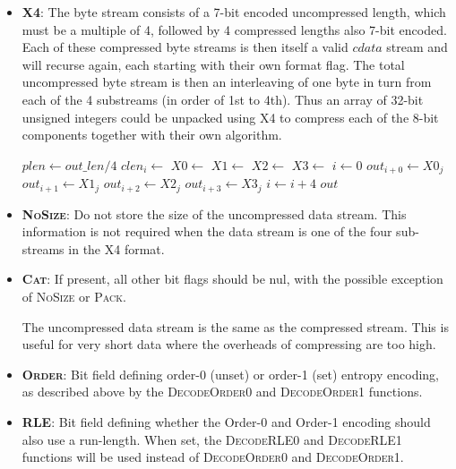 \documentclass[a4paper]{article}
\begin{document}
\begin{itemize}
\item{\textbf{\textsc{X4}}:}
The byte stream consists of a 7-bit encoded uncompressed length, which
must be a multiple of 4, followed by 4 compressed lengths also 7-bit
encoded.  Each of these compressed byte streams is then itself a valid
$cdata$ stream and will recurse again, each starting with their own
format flag.  The total uncompressed byte stream is then an
interleaving of one byte in turn from each of the 4 substreams (in
order of 1st to 4th).  Thus an array of 32-bit unsigned integers could
be unpacked using X4 to compress each of the 8-bit components together
with their own algorithm.

\begin{algorithmic}[1]
  \State $plen \gets out\_len / 4$
   
    \State $clen_i \gets $
  \EndFor
  \State $X0 \gets $ 
  \State $X1 \gets $
  \State $X2 \gets $
  \State $X3 \gets $
  \Statex
  \State $i \gets 0$
   
    \State $out_{i+0} \gets X0_j$
    \State $out_{i+1} \gets X1_j$
    \State $out_{i+2} \gets X2_j$
    \State $out_{i+3} \gets X3_j$
    \State $i \gets i+4$
  \EndFor
  \State \Return $out$
\EndFunction
\end{algorithmic}

\item{\textbf{\textsc{NoSize}}:}
Do not store the size of the uncompressed data stream.
This information is not required when the data stream is one of the four sub-streams in the X4 format.

\item{\textbf{\textsc{Cat}}:}
If present, all other bit flags should be nul, with the possible
exception of \textsc{NoSize} or \textsc{Pack}.

The uncompressed data stream is the same as the compressed stream.
This is useful for very short data where the overheads of compressing are too high.

\item{\textbf{\textsc{Order}}:}
Bit field defining order-0 (unset) or order-1 (set) entropy encoding, as described above by the \textsc{DecodeOrder0} and \textsc{DecodeOrder1} functions.

\item{\textbf{\textsc{RLE}}:}
Bit field defining whether the Order-0 and Order-1 encoding should also use a run-length.
When set, the \textsc{DecodeRLE0} and \textsc{DecodeRLE1} functions will be used instead of \textsc{DecodeOrder0} and \textsc{DecodeOrder1}.


\end{itemize}
\end{document}
